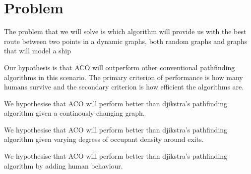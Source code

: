 \chapter{Problem}
\label{ch:problem}


The problem that we will solve is which algorithm will provide us with the best route between 
two points in a dynamic graphs, both random graphs and graphs that will model a ship

Our hypothesis is that ACO will outperform other conventional pathfinding algorithms
in this scenario. The primary criterion of performance is how many humans survive and
the secondary criterion is how efficient the algorithms are.

We hypothesise that ACO will perform better than djikstra's pathfinding algorithm
given a continously changing graph.

We hypothesise that ACO will perform better than djikstra's pathfinding algorithm
given varying degress of occupant density around exits.

We hypothesise that ACO will perform better than djikstra's pathfinding algorithm
by adding human behaviour.

